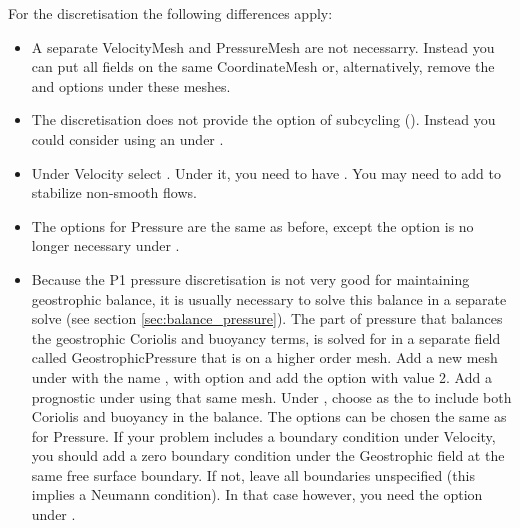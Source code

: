 For the \Poo discretisation the following differences apply:
\begin{itemize}
  \item A separate VelocityMesh and PressureMesh are not necessarry. Instead you
    can put all fields on the same CoordinateMesh or, alternatively, remove the
     and  options under
    these meshes.
  \item The \Poo discretisation does not provide the option of subcycling
    (). Instead
    you could consider using an  under
    .
  \item Under Velocity select
    . Under it,
    you need to have . You may need
    to add  to stabilize non-smooth
    flows.
  \item The options for Pressure are the same as before, except the option
     is no longer necessary under
    .
  \item Because the P1 pressure discretisation is not very good for maintaining
    geostrophic balance, it is usually necessary to solve this balance in a
    separate solve (see section \ref{sec:balance_pressure}). The part of pressure that balances the geostrophic
    Coriolis and buoyancy terms, is solved for in a separate field called
    GeostrophicPressure that is on a higher order mesh. Add a new mesh under
     with the name , with
    option  and add
    the option  with value 2.
    Add a prognostic  under
     using that same mesh. Under
    , choose 
    as the  to include both Coriolis and
    buoyancy in the balance. The  options can be chosen
    the same as for Pressure. If your problem includes a
     boundary condition under Velocity, you should
    add a zero  boundary condition under the
    Geostrophic field at the same free surface boundary. If not, leave all
    boundaries unspecified (this implies a Neumann condition). In that case
    however, you need the option  under
    .
\end{itemize}

